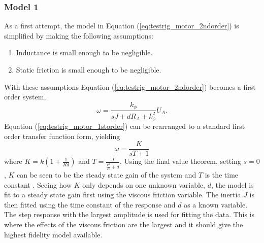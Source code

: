 \subsubsection{Model 1}
As a first attempt, the model in Equation (\ref{eq:testrig_motor_2ndorder}) is 
simplified by making the following assumptions:
\begin{enumerate}
    \item Inductance is small enough to be negligible.
    \item Static friction is small enough to be negligible.
\end{enumerate}
With these assumptions
Equation (\ref{eq:testrig_motor_2ndorder}) becomes a first order system,
\begin{equation} \label{eq:testrig_motor_1storder}
    \omega = \frac {k_{\phi}} {sJ + d R_A + k_{\phi}^2} U_A.
\end{equation}
Equation (\ref{eq:testrig_motor_1storder}) can be rearranged to a standard first
order transfer function form, yielding
\begin{equation} \label{eq:testrig_motor_1storder_rewrite}
    \omega = \frac {K} {s T + 1}
\end{equation}
where $K = k(1 + \frac{1} {R d})$ and $T = \frac {J} {\frac{k^2} {R} + d}$.
Using the final value theorem, setting $s = 0$, $K$ can be seen to be the steady
state gain of the system and $T$ is the time constant \cite{reglerteknik2006}.
Seeing how $K$ only depends on one unknown variable, $d$, the model is fit to a
steady state gain first using the viscous friction variable. The inertia $J$ is
then fitted using the time constant of the response and $d$ as a known variable.
The step response with the largest amplitude is used for fitting the data. This
is where the effects of the viscous friction are the largest and it should give
the highest fidelity model available. 

